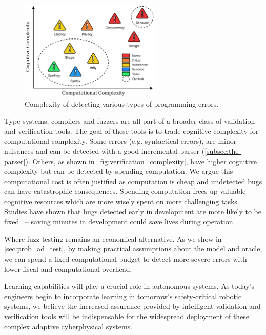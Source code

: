 \begin{figure}
    \centering
    \includegraphics[width=0.60\textwidth]{../figures/verification_complexity.png}
    \caption{Complexity of detecting various types of programming errors.}
    \label{fig:verification_complexity}
\end{figure}

Type systems, compilers and fuzzers are all part of a broader class of validation and verification tools. The goal of these tools is to trade cognitive complexity for computational complexity. Some errors (e.g. syntactical errors), are minor nuisances and can be detected with a good incremental parser (\autoref{subsec:the-parser}). Others, as shown in~\autoref{fig:verification_complexity}, have higher cognitive complexity but can be detected by spending computation. We argue this computational cost is often justified as computation is cheap and undetected bugs can have catastrophic consequences. Spending computation frees up valuable cognitive resources which are more wisely spent on more challenging tasks. Studies have shown that bugs detected early in development are more likely to be fixed~\citep{distefano2019scaling} -- saving minutes in development could save lives during operation.

Where fuzz testing remains an economical alternative. As we show in \autoref{sec:prob_ad_test}, by making practical assumptions about the model and oracle, we can spend a fixed computational budget to detect more severe errors with lower fiscal and computational overhead.

Learning capabilities will play a crucial role in autonomous systems. As today's engineers begin to incorporate learning in tomorrow's safety-critical robotic systems, we believe the increased assurance provided by intelligent validation and verification tools will be indispensable for the widespread deployment of these complex adaptive cyberphysical systems.